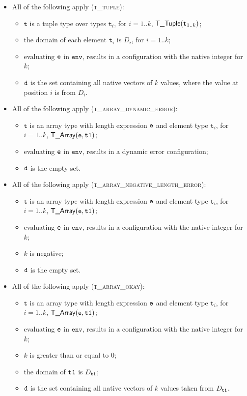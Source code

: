 \documentclass{book}
\newcommand\env[0]{\texttt{env}}
\newcommand\vt[0]{\texttt{t}}
\begin{document}
\begin{itemize}
  \item All of the following apply (\textsc{t\_tuple}):
  \begin{itemize}
    \item $\vt$ is a tuple type over types $\vt_i$, for $i=1..k$, $\TTuple(\vt_{1..k})$;
    \item the domain of each element $\vt_i$ is $D_i$, for $i=1..k$;
    \item evaluating $\texttt{e}$ in $\env$, results in a configuration with the native integer for $k$;
    \item $\texttt{d}$ is the set containing all native vectors of $k$ values, where the value at position $i$
    is from $D_i$.
  \end{itemize}

  \item All of the following apply (\textsc{t\_array\_dynamic\_error}):
  \begin{itemize}
    \item $\vt$ is an array type with length expression $\texttt{e}$ and element type $\vt_i$, for $i=1..k$, $\textsf{T\_Array}(\texttt{e}, \texttt{t1})$;
    \item evaluating $\texttt{e}$ in $\env$, results in a dynamic error configuration;
    \item $\texttt{d}$ is the empty set.
  \end{itemize}

  \item All of the following apply (\textsc{t\_array\_negative\_length\_error}):
  \begin{itemize}
    \item $\vt$ is an array type with length expression $\texttt{e}$ and element type $\vt_i$, for $i=1..k$, $\textsf{T\_Array}(\texttt{e}, \texttt{t1})$;
    \item evaluating $\texttt{e}$ in $\env$, results in a configuration with the native integer for $k$;
    \item $k$ is negative;
    \item $\texttt{d}$ is the empty set.
  \end{itemize}

  \item All of the following apply (\textsc{t\_array\_okay}):
  \begin{itemize}
    \item $\vt$ is an array type with length expression $\texttt{e}$ and element type $\vt_i$, for $i=1..k$, $\textsf{T\_Array}(\texttt{e}, \texttt{t1})$;
    \item evaluating $\texttt{e}$ in $\env$, results in a configuration with the native integer for $k$;
    \item $k$ is greater than or equal to $0$;
    \item the domain of $\texttt{t1}$ is $D_{\texttt{t1}}$;
    \item $\texttt{d}$ is the set containing all native vectors of $k$ values taken from $D_{\texttt{t1}}$.
  \end{itemize}


\end{itemize}
\end{document}

